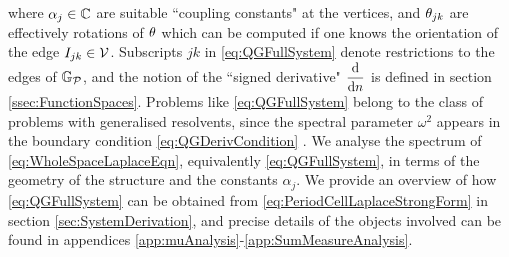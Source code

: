 where $\alpha_j\in\mathbb{C}$ are suitable ``coupling constants" at the vertices, and $\theta_{jk}$ are effectively rotations of $\theta$ which can be computed if one knows the orientation of the edge $I_{jk}\in\mathcal{V}$.
Subscripts $jk$ in \eqref{eq:QGFullSystem} denote restrictions to the edges of $\mathbb{G}_{\mathcal{P}}$, and the notion of the ``signed derivative" $\dfrac{\mathrm{d}}{\mathrm{d}n}$ is defined in section \ref{ssec:FunctionSpaces}.
Problems like \eqref{eq:QGFullSystem} belong to the class of problems with generalised resolvents, since the spectral parameter $\omega^2$ appears in the boundary condition \eqref{eq:QGDerivCondition} .
We analyse the spectrum of \eqref{eq:WholeSpaceLaplaceEqn}, equivalently \eqref{eq:QGFullSystem}, in terms of the geometry of the structure and the constants $\alpha_j$.
We provide an overview of how \eqref{eq:QGFullSystem} can be obtained from \eqref{eq:PeriodCellLaplaceStrongForm} in section \ref{sec:SystemDerivation}, and precise details of the objects involved can be found in appendices \ref{app:muAnalysis}-\ref{app:SumMeasureAnalysis}.
